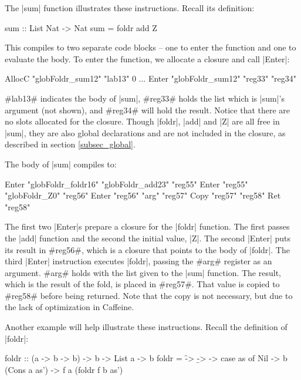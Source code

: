 \documentclass[11pt]{article}
\begin{document}
The |sum| function illustrates these instructions. Recall its
definition:

\begin{code}
sum :: List Nat -> Nat
sum = foldr add Z
\end{code}

\noindent
This compiles to two separate code blocks -- one to enter the function
and one to evaluate the body. To enter the function, we allocate a
closure and call |Enter|:

\begin{code}
  AllocC "globFoldr_sum12" "lab13" 0
  ...
  Enter "globFoldr_sum12" "reg33" "reg34" 
\end{code}

\noindent
#lab13# indicates the body of |sum|, #reg33# holds the list
which is |sum|'s argument (not shown), and #reg34# will hold the
result. Notice that there are no slots allocated for the
closure. Though |foldr|, |add| and |Z| are all free in |sum|, they
are also global declarations and are not included in the closure, as described in
section \ref{subsec_global}.

The body of |sum| compiles to:

\begin{code}
  Enter "globFoldr_foldr16" "globFoldr_add23" "reg55"
  Enter "reg55" "globFoldr_Z0" "reg56"
  Enter "reg56" "arg" "reg57"
  Copy "reg57" "reg58"
  Ret "reg58"
\end{code}

\noindent
The first two |Enter|s prepare a closure for the |foldr| function. The
first passes the |add| function and the second the initial value,
|Z|. The second |Enter| puts its result in #reg56#, which is a closure
that points to the body of |foldr|. The third |Enter| instruction
executes |foldr|, passing the #arg# register as an argument. #arg#
holds with the list given to the |sum| function. The result, which is
the result of the fold, is placed in #reg57#. That value is
copied to #reg58# before being returned. Note that the copy is not
necessary, but due to the lack of optimization in Caffeine.

Another example will help illustrate these instructions. Recall the
definition of |foldr|:

\begin{code}
foldr :: (a -> b -> b) -> b -> List a -> b
foldr = \f -> \b -> \as -> 
          case as of
           Nil           -> b
           (Cons a as')  -> f a (foldr f b as')
\end{code}
\end{document}
